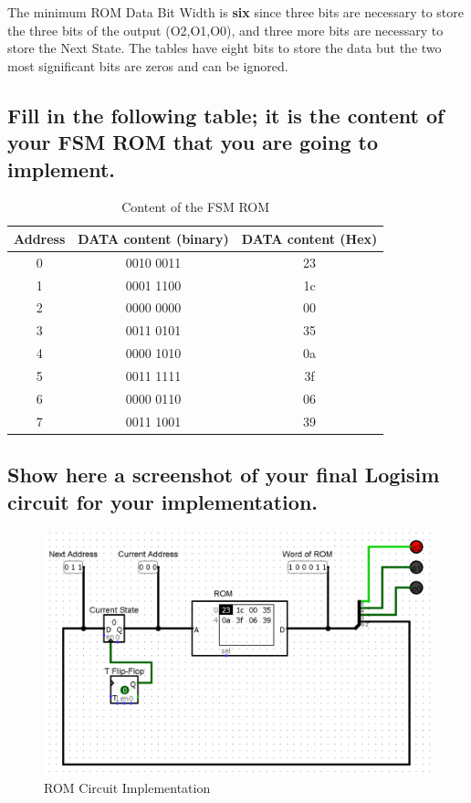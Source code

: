 \documentclass{article}
\begin{document}
		The minimum ROM Data Bit Width is \textbf{six} since three bits are necessary to store the three bits of the output (O2,O1,O0), and three more bits are necessary to store the Next State. The tables have eight bits to store the data but the two most significant bits are zeros and can be ignored.
		
		\subsection{Fill in the following table; it is the content of your FSM ROM that you are going to implement.}
		\begin{table}[!ht]
			\centering
			\caption{Content of the FSM ROM}
			\begin{tabular}{|c|c|c|}
				\hline
				Address & DATA content (binary) & DATA content (Hex)\\
				\hline\hline
				0 & 0010 0011 & 23\\
				\hline
				1 & 0001 1100 & 1c\\
				\hline
				2 & 0000 0000 & 00\\
				\hline
				3 & 0011 0101 & 35\\
				\hline
				4 & 0000 1010 & 0a\\
				\hline
				5 & 0011 1111 & 3f\\
				\hline
				6 & 0000 0110 & 06\\
				\hline
				7 & 0011 1001 & 39\\
				\hline
			\end{tabular}       	
		\end{table}
		
		\pagebreak
		
		\subsection{Show here a screenshot of your final Logisim circuit for your implementation.}
		\begin{figure}[!h]
			\centering
			\includegraphics[width=\linewidth]{circuit.png}
			\caption{ROM Circuit Implementation}
		\end{figure}
		
\end{document}
